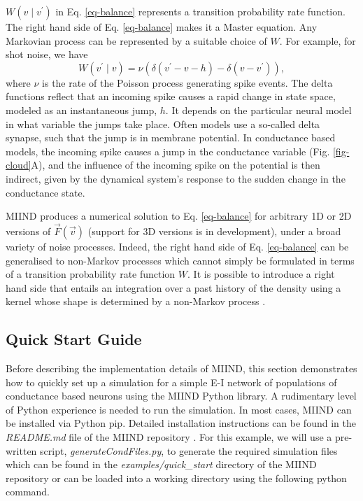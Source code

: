 \documentclass[utf8]{frontiersSCNS} %
\begin{document}
$W(v \mid v^{\prime})$ in Eq. \ref{eq-balance} represents a transition probability rate function. The right hand side of Eq. \ref{eq-balance} makes it a Master equation. Any Markovian process can be represented by a suitable choice of $W$. For example, for shot noise, we have
\begin{equation}   
\label{master_equation}
  W(v^{\prime} \mid v) = \nu (\delta (v^{\prime} - v - h)  - \delta( v - v^{\prime})),  
\end{equation}
where $\nu$ is the rate of the Poisson process generating spike events. The delta functions reflect that an incoming spike causes a rapid change in state space, modeled as an instantaneous jump, $h$. It depends on the particular neural model in what variable the jumps take place. Often models use a so-called delta synapse, such that the jump is in membrane potential. In conductance based models, the incoming spike causes a jump in the conductance variable (Fig. \ref{fig-cloud}A), and the influence of the incoming spike on the potential is then indirect, given by the dynamical system's response to the sudden change in the conductance state.

MIIND produces a numerical solution to Eq. \ref{eq-balance} for arbitrary 1D or 2D versions of $\vec{F}(\vec{v})$ (support for 3D versions is in development), under a broad variety of noise processes. Indeed, the right hand side of Eq. \ref{eq-balance} can be generalised to non-Markov processes which cannot simply be formulated in terms of a transition probability rate function $W$. It is possible to introduce a right hand side that entails an integration over a past history of the density using a kernel whose shape is determined by a non-Markov process \citep{lai2017population}.\\

\subsection{Quick Start Guide}
\label{section:quickstart}
Before describing the implementation details of MIIND, this section demonstrates how to quickly set up a simulation for a simple E-I network of populations of conductance based neurons using the MIIND Python library. A rudimentary level of Python experience is needed to run the simulation. In most cases, MIIND can be installed via Python pip. Detailed installation instructions can be found in the \textit{README.md} file of the MIIND repository \citep{miindwebsite}. For this example, we will use a pre-written script, \textit{generateCondFiles.py}, to generate the required simulation files which can be found in the \textit{examples/quick\_start} directory of the MIIND repository or can be loaded into a working directory using the following python command.
\end{document}
